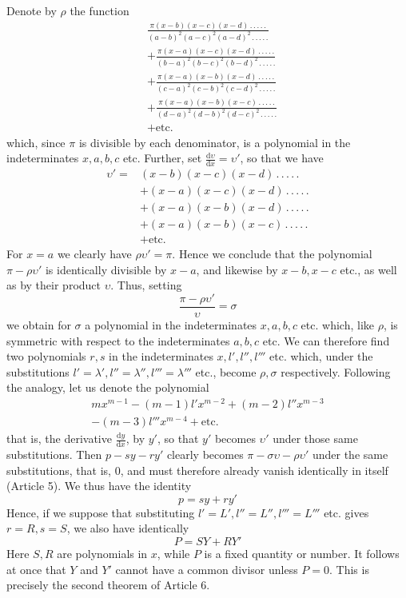 Denote by $\rho$ the function
\[
\begin{aligned}
&\frac{\pi(x-b)(x-c)(x-d)\, .\, .\, .\, .\, .}{(a-b)^2(a-c)^2(a-d)^2\, .\, .\, .\, .\, .}\\
&+\frac{\pi(x-a)(x-c)(x-d)\, .\, .\, .\, .\, .}{(b-a)^2(b-c)^2(b-d)^2\, .\, .\, .\, .\, .}\\
&+\frac{\pi(x-a)(x-b)(x-d)\, .\, .\, .\, .\, .}{(c-a)^2(c-b)^2(c-d)^2\, .\, .\, .\, .\, .}\\
&+\frac{\pi(x-a)(x-b)(x-c)\, .\, .\, .\, .\, .}{(d-a)^2(d-b)^2(d-c)^2\, .\, .\, .\, .\, .}\\
&+\text{etc.}
\end{aligned}
\]
which, since $\pi$ is divisible by each denominator, is a polynomial in the indeterminates $x,a,b,c$ etc. Further, set $\frac{\mathrm d\upsilon}{\mathrm dx}=\upsilon'$, so that we have
\[
\begin{aligned}
\upsilon'={}&(x-b)(x-c)(x-d)\, .\, .\, .\, .\, .\\
&+(x-a)(x-c)(x-d)\, .\, .\, .\, .\, .\\
&+(x-a)(x-b)(x-d)\, .\, .\, .\, .\, .\\
&+(x-a)(x-b)(x-c)\, .\, .\, .\, .\, .\\
&+\text{etc.}
\end{aligned}
\]
For $x=a$ we clearly have $\rho\upsilon'=\pi$. Hence we conclude that the polynomial $\pi-\rho\upsilon'$ is identically divisible by $x-a$, and likewise by $x-b,x-c$ etc., as well as by their product $\upsilon$. Thus, setting
\[
\frac{\pi-\rho\upsilon'}{\upsilon}=\sigma
\]
we obtain for $\sigma$ a polynomial in the indeterminates $x,a,b,c$ etc. which, like $\rho$, is symmetric with respect to the indeterminates $a,b,c$ etc. We can therefore find two polynomials $r,s$ in the indeterminates $x,l',l'',l'''$ etc. which, under the substitutions $l'=\lambda',l''=\lambda'',l'''=\lambda'''$ etc., become $\rho,\sigma$ respectively. Following the analogy, let us denote the polynomial
\[
\begin{gathered}mx^{m-1}-(m-1)l'x^{m-2}+(m-2)l''x^{m-3}\\-(m-3)l'''x^{m-4}+\text{etc.}\end{gathered}
\]
that is, the derivative $\frac{\mathrm dy}{\mathrm dx}$, by $y'$, so that $y'$ becomes $\upsilon'$ under those same
substitutions. Then $p-sy-ry'$ clearly becomes $\pi-\sigma\upsilon-\rho\upsilon'$ under the same substitutions, that is, 0, and must therefore already vanish identically in itself (Article 5). We thus have the identity
\[
p=sy+ry'
\]
Hence, if we suppose that substituting $l'=L',l''=L'',l'''=L'''$ etc. gives $r=R,s=S$, we also have identically
\[
P=SY+RY'
\]
Here $S,R$ are polynomials in $x$, while $P$ is a fixed quantity or number. It follows at once that $Y$ and $Y'$ cannot have a common divisor unless $P=0$. This is precisely the second theorem of Article 6.

